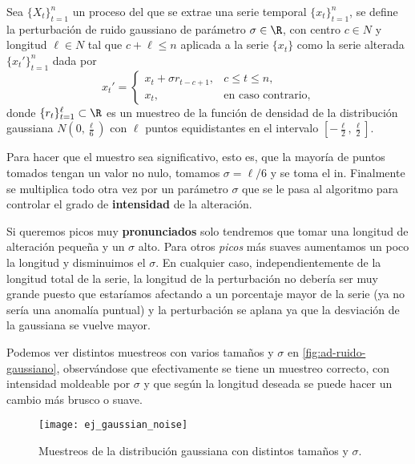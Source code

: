 \begin{definicion}
  Sea $\{X_t\}_{t = 1}^n$ un proceso del que se extrae una serie temporal $\{x_t\}_{t = 1}^n$, se define la perturbación de ruido gaussiano de parámetro $\sigma \in \R$, con centro $c \in N$ y longitud $\ell \in N$ tal que $c + \ell \leq n$ aplicada a la serie $\{x_t\}$ como la serie alterada $\{x_t'\}_{t = 1}^n$ dada por
  $$x_t' = \begin{cases}
    x_t + \sigma r_{t - c + 1}, & c \leq t \leq n, \\
    x_t, & \text{en caso contrario,}
  \end{cases}$$
  donde $\{r_t\}_{t = 1}^\ell \subset \R$ es un muestreo de la función de densidad de la distribución gaussiana $N(0, \frac{\ell}{6})$ con $\ell$ puntos equidistantes en el intervalo $[-\frac{\ell}{2}, \frac{\ell}{2}]$.
  \label{def:ruido-gauss}
\end{definicion}

Para hacer que el muestro sea significativo, esto es, que la mayoría de puntos tomados tengan un valor no nulo, tomamos $\sigma = \ell / 6$ y se toma el in. Finalmente se multiplica todo otra vez por un parámetro $\sigma$ que se le pasa al algoritmo para controlar el grado de \textbf{intensidad} de la alteración.

Si queremos picos muy \textbf{pronunciados} solo tendremos que tomar una longitud de alteración pequeña y un $\sigma$ alto. Para otros \emph{picos} más suaves aumentamos un poco la longitud y disminuimos el $\sigma$. En cualquier caso, independientemente de la longitud total de la serie, la longitud de la perturbación no debería ser muy grande puesto que estaríamos afectando a un porcentaje mayor de la serie (ya no sería una anomalía puntual) y la perturbación se aplana ya que la desviación de la gaussiana se vuelve mayor.

Podemos ver distintos muestreos con varios tamaños y $\sigma$ en \autoref{fig:ad-ruido-gaussiano}, observándose que efectivamente se tiene un muestreo correcto, con intensidad moldeable por $\sigma$ y que según la longitud deseada se puede hacer un cambio más brusco o suave.

\begin{figure}[htpb]
  \centering
  \texttt{[image: ej\_gaussian\_noise]}
  \caption{Muestreos de la distribución gaussiana con distintos tamaños y $\sigma$.}
  \label{fig:ad-ruido-gaussiano}
\end{figure}

